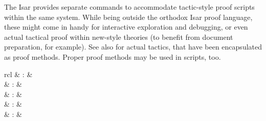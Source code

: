 \begin{isabellebody}
\begin{isamarkuptext}
\begin{description}
  \end{description}%
\end{isamarkuptext}%
\isamarkuptrue%
%
\isamarkuptrue%
%
\begin{isamarkuptext}%
The Isar provides separate commands to accommodate tactic-style
  proof scripts within the same system.  While being outside the
  orthodox Isar proof language, these might come in handy for
  interactive exploration and debugging, or even actual tactical proof
  within new-style theories (to benefit from document preparation, for
  example).  See also  for actual tactics, that
  have been encapsulated as proof methods.  Proper proof methods may
  be used in scripts, too.

  \begin{matharray}{rcl}
    \hypertarget{command.apply}{\hyperlink{command.apply}{\mbox{}}}\isa{{\isachardoublequote}\isactrlsup {\isacharasterisk}{\isachardoublequote}} & : &  \\
    \hypertarget{command.apply-end}{\hyperlink{command.apply-end}{\mbox{}}}\isa{{\isachardoublequote}\isactrlsup {\isacharasterisk}{\isachardoublequote}} & : &  \\
    \hypertarget{command.done}{\hyperlink{command.done}{\mbox{}}}\isa{{\isachardoublequote}\isactrlsup {\isacharasterisk}{\isachardoublequote}} & : &  \\
    \hypertarget{command.defer}{\hyperlink{command.defer}{\mbox{}}}\isa{{\isachardoublequote}\isactrlsup {\isacharasterisk}{\isachardoublequote}} & : &  \\
    \hypertarget{command.prefer}{\hyperlink{command.prefer}{\mbox{}}}\isa{{\isachardoublequote}\isactrlsup {\isacharasterisk}{\isachardoublequote}} & : &  \\

\end{matharray}
\end{isamarkuptext}
\end{isabellebody}
